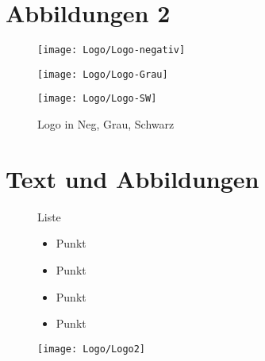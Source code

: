 \documentclass[a4paper,fontsize=14pt,DIV=calc,fleqn,parskip=half]{scrartcl}
\begin{document}
\section*{Abbildungen 2}%
%
\begin{figure}[!h]%
	\centering
	\begin{minipage}[b]{0.40\textwidth}
		\texttt{[image: Logo/Logo-negativ]}%
	\end{minipage}
	\hfill
	\begin{minipage}[b]{0.30\textwidth}
		\texttt{[image: Logo/Logo-Grau]}%
	\end{minipage}
	\hfill
	\begin{minipage}[b]{0.20\textwidth}
		\texttt{[image: Logo/Logo-SW]}%
	\end{minipage}
	\caption{Logo in Neg, Grau, Schwarz}\label{fig:logoneggrauschwarz}%
\end{figure}

\newpage
\section*{Text und Abbildungen}%
%
\begin{figure}[!h]%
	\centering
	\begin{minipage}[c]{0.55\textwidth}
		Liste
		\begin{itemize} 
			\item Punkt
			\item Punkt
			\item Punkt
			\item Punkt
		\end{itemize}
	\end{minipage}
	\hfill
	\begin{minipage}[c]{0.35\textwidth}
		\texttt{[image: Logo/Logo2]}%
	\end{minipage}
\end{figure}
\end{document}
